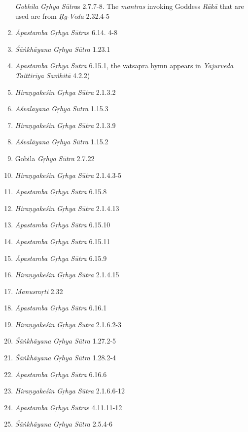 \begin{enumerate}
  \emph{Gobhila} \emph{Gṛhya} \emph{Sūtra}s 2.7.7-8. The \emph{mantras} invoking Goddess \emph{Rākā} that are used are from \emph{Ṛg}-\emph{Veda} 2.32.4-5
\item
  \emph{Āpastamba} \emph{Gṛhya} \emph{Sūtra}s 6.14. 4-8
\item
  \emph{Śāṅkhāyana} \emph{Gṛhya} \emph{Sūtra} 1.23.1
\item
  \emph{Āpastamba} \emph{Gṛhya} \emph{Sūtra} 6.15.1, the vatsapra hymn appears in \emph{Yajurveda} \emph{Taittirīya} \emph{Saṁhitā} 4.2.2)
\item
  \emph{Hiraṇyakeśin} \emph{Gṛhya} \emph{Sūtra} 2.1.3.2
\item
  \emph{Āśvalāyana} \emph{Gṛhya} \emph{Sūtra} 1.15.3
\item
  \emph{Hiraṇyakeśin} \emph{Gṛhya} \emph{Sūtra} 2.1.3.9
\item
  \emph{Āśvalāyana} \emph{Gṛhya} \emph{Sūtra} 1.15.2
\item
  Gobila \emph{Gṛhya} \emph{Sūtra} 2.7.22
\item
  \emph{Hiraṇyakeśin} \emph{Gṛhya} \emph{Sūtra} 2.1.4.3-5
\item
  \emph{Āpastamba} \emph{Gṛhya} \emph{Sūtra} 6.15.8
\item
  \emph{Hiraṇyakeśin} \emph{Gṛhya} \emph{Sūtra} 2.1.4.13
\item
  \emph{Āpastamba} \emph{Gṛhya} \emph{Sūtra} 6.15.10
\item
  \emph{Āpastamba} \emph{Gṛhya} \emph{Sūtra} 6.15.11
\item
  \emph{Āpastamba} \emph{Gṛhya} \emph{Sūtra} 6.15.9
\item
  \emph{Hiraṇyakeśin} \emph{Gṛhya} \emph{Sūtra} 2.1.4.15
\item
  \emph{Manusmṛti} 2.32
\item
  \emph{Āpastamba} \emph{Gṛhya} \emph{Sūtra} 6.16.1
\item
  \emph{Hiraṇyakeśin} \emph{Gṛhya} \emph{Sūtra} 2.1.6.2-3
\item
  \emph{Śāṅkhāyana} \emph{Gṛhya} \emph{Sūtra} 1.27.2-5
\item
  \emph{Śāṅkhāyana} \emph{Gṛhya} \emph{Sūtra} 1.28.2-4
\item
  \emph{Āpastamba} \emph{Gṛhya} \emph{Sūtra} 6.16.6
\item
  \emph{Hiraṇyakeśin} \emph{Gṛhya} \emph{Sūtra} 2.1.6.6-12
\item
  \emph{Āpastamba} \emph{Gṛhya} \emph{Sūtra}s 4.11.11-12
\item
  \emph{Śāṅkhāyana} \emph{Gṛhya} \emph{Sūtra} 2.5.4-6

\end{enumerate}
